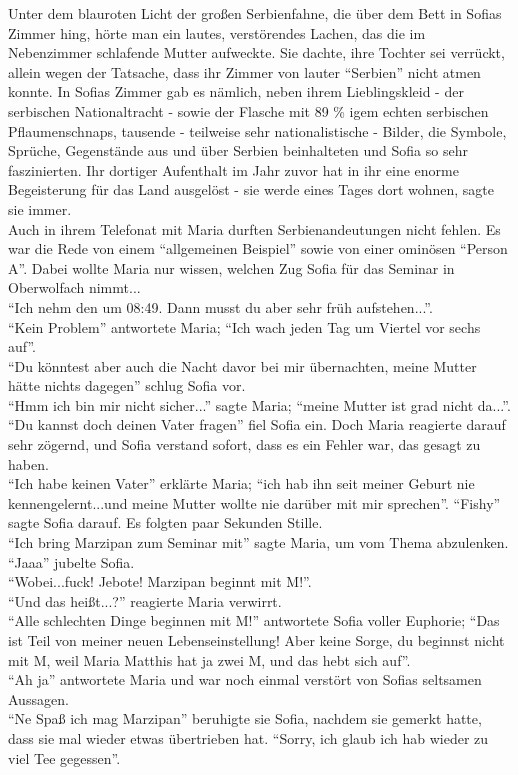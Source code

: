 \documentclass[oneside]{memoir}
\begin{document}
     Unter dem blauroten Licht der großen Serbienfahne, die über dem Bett in Sofias Zimmer hing, hörte man ein lautes, verstörendes Lachen, das die im Nebenzimmer schlafende Mutter aufweckte. Sie dachte, ihre Tochter sei verrückt, allein wegen der Tatsache, dass ihr Zimmer von lauter “Serbien” nicht atmen konnte. In Sofias Zimmer gab es nämlich, neben ihrem Lieblingskleid - der serbischen Nationaltracht - sowie der Flasche mit 89 \% igem echten serbischen Pflaumenschnaps, tausende - teilweise sehr nationalistische - Bilder, die Symbole, Sprüche, Gegenstände aus und über Serbien beinhalteten und Sofia so sehr faszinierten. Ihr dortiger Aufenthalt im Jahr zuvor hat in ihr eine enorme Begeisterung für das Land ausgelöst - sie werde eines Tages dort wohnen, sagte sie immer. \\
Auch in ihrem Telefonat mit Maria durften Serbienandeutungen nicht fehlen. Es war die Rede von einem “allgemeinen Beispiel” sowie von einer ominösen “Person A”. Dabei wollte Maria nur wissen, welchen Zug Sofia für das Seminar in Oberwolfach nimmt...  \\ 
“Ich nehm den um 08:49. Dann musst du aber sehr früh aufstehen...”.  \\ 
“Kein Problem” antwortete Maria; “Ich wach jeden Tag um Viertel vor sechs auf”. \\  
“Du könntest aber auch die Nacht davor bei mir übernachten, meine Mutter hätte nichts dagegen” schlug Sofia vor.  \\ 
“Hmm ich bin mir nicht sicher...” sagte Maria; “meine Mutter ist grad nicht da...”.  \\ 
“Du kannst doch deinen Vater fragen” fiel Sofia ein. 
Doch Maria reagierte darauf sehr zögernd, und Sofia verstand sofort, dass es ein Fehler war, das gesagt zu haben. \\ 
“Ich habe keinen Vater” erklärte Maria; “ich hab ihn seit meiner Geburt nie kennengelernt...und meine Mutter wollte nie darüber mit mir sprechen”. “Fishy” sagte Sofia darauf. 
Es folgten paar Sekunden Stille. 
 \\ 
“Ich bring Marzipan zum Seminar mit”  sagte Maria, um vom Thema abzulenken. 
“Jaaa” jubelte Sofia.  \\ 
“Wobei...fuck! Jebote! Marzipan beginnt mit M!”.  \\ 
“Und das heißt...?” reagierte Maria verwirrt.  \\ 
“Alle schlechten Dinge beginnen mit M!” antwortete Sofia voller Euphorie; “Das ist Teil von meiner neuen Lebenseinstellung! Aber keine Sorge, du beginnst nicht mit M, weil Maria Matthis hat ja zwei M, und das hebt sich auf”.  \\ 
“Ah ja” antwortete Maria und war noch einmal verstört von Sofias seltsamen Aussagen.  \\ 
“Ne Spaß ich mag Marzipan” beruhigte sie Sofia, nachdem sie gemerkt hatte, dass sie mal wieder etwas übertrieben hat.
“Sorry, ich glaub ich hab wieder zu viel Tee gegessen”.
\end{document}
